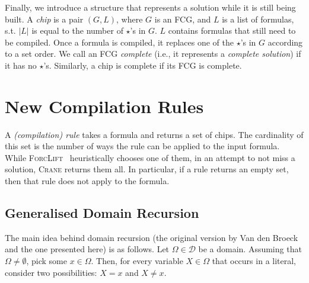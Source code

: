 \documentclass{article}
\begin{document}
Finally, we introduce a structure that represents a solution while it is still
being built. A \emph{chip} is a pair $(G, L)$, where $G$ is an FCG, and $L$ is a
list of formulas, s.t. $|L|$ is equal to the number of $\star$'s in $G$. $L$
contains formulas that still need to be compiled. Once a formula is compiled, it
replaces one of the $\star$'s in $G$ according to a set order. We call an FCG
\emph{complete} (i.e., it represents a \emph{complete solution}) if it has no
$\star$'s. Similarly, a chip is complete if its FCG is complete.

\section{New Compilation Rules}\label{sec:rules}

A \emph{(compilation) rule} takes a formula and returns a set of chips. The
cardinality of this set is the number of ways the rule can be applied to the
input formula. While \textsc{ForcLift}~\cite{DBLP:conf/ijcai/BroeckTMDR11}
heuristically chooses one of them, in an attempt to not miss a solution,
\textsc{Crane} returns them all. In particular, if a rule returns an empty set,
then that rule does not apply to the formula.

\subsection{Generalised Domain Recursion}\label{sec:dr}

The main idea behind domain recursion (the original version by Van den
Broeck~ and the one presented here) is as
follows. Let $\Omega \in \mathcal{D}$ be a domain. Assuming that
$\Omega \ne \emptyset$, pick some $x \in \Omega$. Then, for every variable
$X \in \Omega$ that occurs in a literal, consider two possibilities: $X = x$ and
$X \ne x$.
\end{document}
